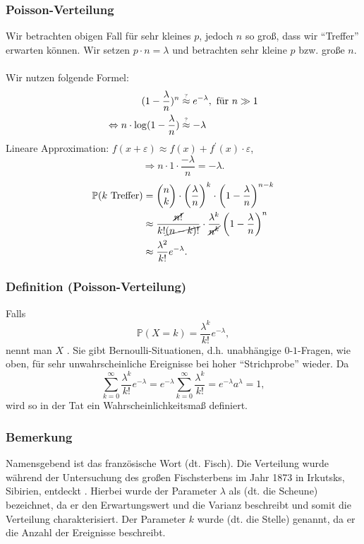 \subsubsection{Poisson-Verteilung}
Wir betrachten obigen Fall f\"ur sehr kleines $p$, jedoch $n$ so gro\ss{}, dass wir ``Treffer'' erwarten k\"onnen. Wir setzen $p\cdot n=\lambda$ und betrachten sehr kleine $p$ bzw. gro\ss{}e $n$.
\\~\\
Wir nutzen folgende Formel:
\begin{align*}
(1-\frac{\lambda}{n})^n&\textabove{?}{\approx} e^{-\lambda},\ \text{f\"ur }n\gg1\\
\Leftrightarrow n\cdot\log(1-\frac{\lambda}{n})&\textabove{?}{\approx}-\lambda\\
\end{align*}
Lineare Approximation: $f(x+\varepsilon)\approx f(x)+f^\prime(x)\cdot\varepsilon$,
\[
\Rightarrow n\cdot1\cdot\frac{-\lambda}{n}=-\lambda.
\]
\begin{align*}
\mathbb{P}(k\text{ Treffer})&=\begin{pmatrix}n\\k\end{pmatrix}\cdot\left(\frac{\lambda}{n}\right)^k\cdot\left(1-\frac{\lambda}{n}\right)^{n-k}\\
&\approx\frac{\cancel{n!}}{k!\cancel{(n-k)!}}\cdot\frac{\lambda^k}{\cancel{n^k}}\left(1-\frac{\lambda}{n}\right)^n\\
&\approx\frac{\lambda^2}{k!}e^{-\lambda}.
\end{align*}
\subsubsection{Definition (Poisson-Verteilung)}
Falls
\[\mathbb{P}(X=k)=\frac{\lambda^k}{k!}e^{-\lambda},\]
nennt man $X$ . Sie gibt Bernoulli-Situationen, d.h. unabh\"angige $0$-$1$-Fragen, wie oben, f\"ur sehr unwahrscheinliche Ereignisse bei hoher ``Strichprobe'' wieder. Da
\[
\sum_{k=0}^\infty\frac{\lambda^k}{k!}e^{-\lambda}=e^{-\lambda}\sum_{k=0}^\infty\frac{\lambda^k}{k!}=e^{-\lambda}a^{\lambda}=1,
\]
wird so in der Tat ein Wahrscheinlichkeitsma\ss{} definiert.
\subsubsection{Bemerkung}
Namensgebend ist das franz\"osische Wort  (dt. Fisch). Die Verteilung wurde w\"ahrend der Untersuchung des gro\ss{}en Fischsterbens im Jahr 1873 in Irkutsks, Sibirien, entdeckt \cite{Pickl15}. Hierbei wurde der Parameter $\lambda$ als  (dt. die Scheune) bezeichnet, da er den Erwartungswert und die Varianz beschreibt und somit die Verteilung charakterisiert. Der Parameter $k$ wurde  (dt. die Stelle) genannt, da er die Anzahl der Ereignisse beschreibt.

